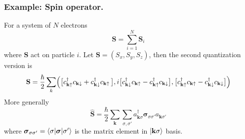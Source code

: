 \documentclass[../../../main.tex]{subfiles}
\begin{document}
\subsubsection{Example: Spin operator.}
For a system of $N$ electrons
\begin{equation*}
  \mathbf{S} = \sum_{i=1}^{N} \mathbf{S}_i
\end{equation*}
where $\mathbf{S }$ act on particle $i$.
Let $\mathbf{S}=(S_x,S_y,S_z)$, then the second quantization version is
\begin{equation*}
  \mathbf{S} = \frac{\hbar}{2}\sum_{k}\Bigl(\bigl[c_{\mathbf{k}\uparrow}^\dagger c_{\mathbf{k}\downarrow}+c_{\mathbf{k}\downarrow}^\dagger c_{\mathbf{k}\uparrow}\,\bigr],
  i\bigl[c_{\mathbf{k}\downarrow}^\dagger c_{\mathbf{k}\uparrow}-c_{\mathbf{k}\uparrow}^\dagger c_{\mathbf{k}\downarrow}\bigr],
  \bigl[c_{\mathbf{k}\uparrow}^\dagger c_{\mathbf{k}\uparrow}-c_{\mathbf{k}\downarrow}^\dagger c_{\mathbf{k}\downarrow}\bigr]\Bigr)
\end{equation*}
More generally
\begin{equation*}
  \mathbf{\hat{S}} = \frac{\hbar}{2}\sum_{\mathbf{k}}\sum_{\sigma,\sigma'} a^\dagger_{\mathbf{k}\sigma}\boldsymbol{\sigma}_{\sigma\sigma'}a_{\mathbf{k}\sigma'}
\end{equation*}
where $\boldsymbol{\sigma}_{\sigma\sigma'} = \braket{\sigma  | \boldsymbol{\sigma }|\sigma'}$ is the matrix element in $\ket{\mathbf{k }\sigma}$ basis.
\end{document}
